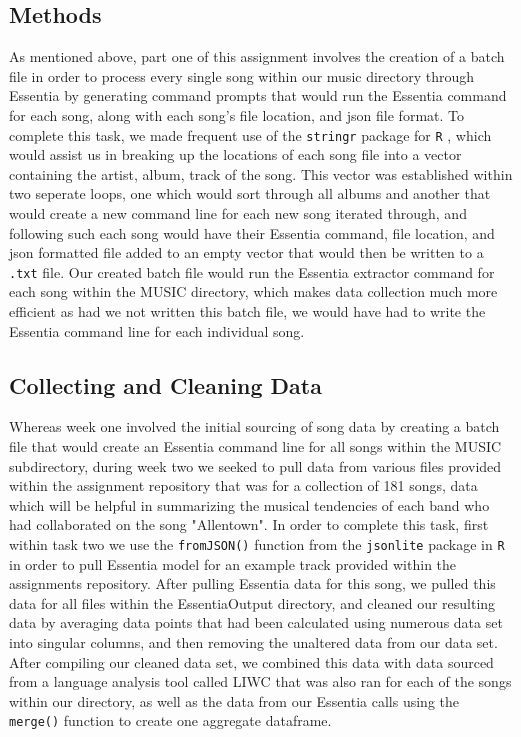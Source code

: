 \documentclass{article}\usepackage[]{graphicx}\usepackage[]{xcolor}
\begin{document}
\begin{multicols}{2}
\section{Methods}
 As mentioned above, part one of this assignment involves the creation of a batch file in order to process every single song within our music directory through Essentia by generating command prompts that would run the Essentia command for each song, along with each song's file location, and json file format. To complete this task, we made frequent use of the \texttt{stringr} package for \texttt{R} \citep{stringr}, which would assist us in breaking up the locations of each song file into a vector containing the artist, album, track of the song. This vector was established within two seperate loops, one which would sort through all albums and another that would create a new command line for each new song iterated through, and following such each song would have their Essentia command, file location, and json formatted file added to an empty vector that would then be written to a \texttt{.txt} file. Our created batch file would run the Essentia extractor command for each song within the MUSIC directory, which makes data collection much more efficient as had we not written this batch file, we would have had to write the Essentia command line for each individual song. 
\subsection{Collecting and Cleaning Data}
Whereas week one involved the initial sourcing of song data by creating a batch file that would create an Essentia command line for all songs within the MUSIC subdirectory, during week two we seeked to pull data from various files provided within the assignment repository that was for a collection of 181 songs, data which will be helpful in summarizing the musical tendencies of each band who had collaborated on the song "Allentown". In order to complete this task, first within task two we use the \texttt{fromJSON()} function from the \texttt{jsonlite} package in \texttt{R} \citep{jsonlite} in order to pull Essentia model for an example track provided within the assignments repository. After pulling Essentia data for this song, we pulled this data for all files within the EssentiaOutput directory, and cleaned our resulting data by averaging data points that had been calculated using numerous data set into singular columns, and then removing the unaltered data from our data set. After compiling our cleaned data set, we combined this data with data sourced from a language analysis tool called LIWC that was also ran for each of the songs within our directory, as well as the data from our Essentia calls using the \texttt{merge()} function to create one aggregate dataframe.

\end{multicols}
\end{document}
